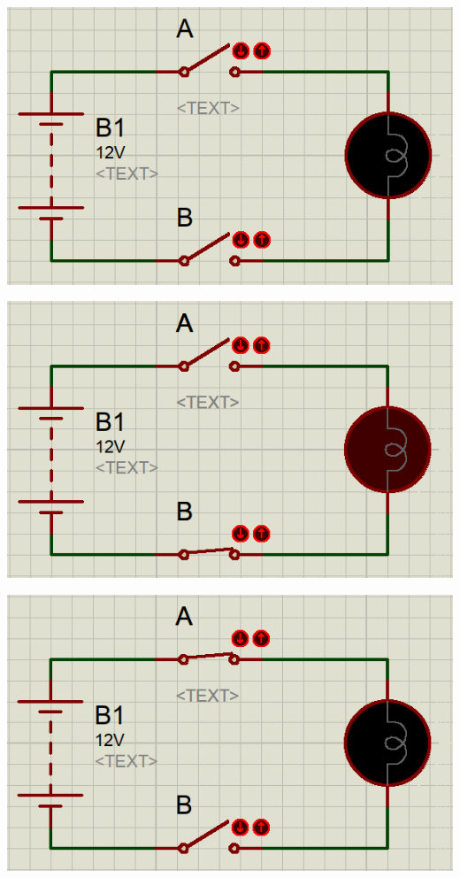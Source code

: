 \begin{multicols}{3}


\begin{center}
	\includegraphics[width=\linewidth]{./IMG/Screenshot_20231216_191616.png}
\end{center}

 
 \begin{center}
 	\includegraphics[width=\linewidth]{./IMG/Screenshot_20231216_191707.png}
 \end{center}

\vfill\null
\columnbreak

\begin{center}
	\includegraphics[width=\linewidth]{./IMG/Screenshot_20231216_191640.png}
\end{center}


\end{multicols}
